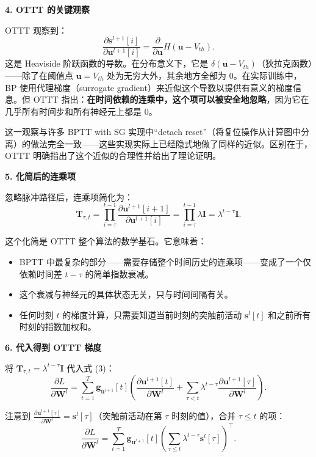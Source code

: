 \documentclass[journal,12pt,onecolumn]{IEEEtran}
\begin{document}
\medskip\noindent\textbf{4. OTTT 的关键观察}

OTTT 观察到：
\[
\frac{\partial \mathbf{s}^{l+1}[i]}{\partial \mathbf{u}^{l+1}[i]} = \frac{\partial}{\partial \mathbf{u}} H(\mathbf{u} - V_{th}).
\]
这是 Heaviside 阶跃函数的导数。在分布意义下，它是 $\delta(\mathbf{u} - V_{th})$（狄拉克函数）——除了在阈值点 $\mathbf{u} = V_{th}$ 处为无穷大外，其余地方全部为 0。在实际训练中，BP 使用代理梯度（surrogate gradient）来近似这个导数以提供有意义的梯度信息。但 OTTT 指出：\textbf{在时间依赖的连乘中，这个项可以被安全地忽略}，因为它在几乎所有时间步和所有神经元上都是 0。

这一观察与许多 BPTT with SG 实现中“detach reset”（将复位操作从计算图中分离）的做法完全一致——这些实现实际上已经隐式地做了同样的近似。区别在于，OTTT 明确指出了这个近似的合理性并给出了理论证明。

\medskip\noindent\textbf{5. 化简后的连乘项}

忽略脉冲路径后，连乘项简化为：
\begin{equation}
    \mathbf{T}_{\tau,t} = \prod_{i=\tau}^{t-1} \frac{\partial \mathbf{u}^{l+1}[i+1]}{\partial \mathbf{u}^{l+1}[i]} = \prod_{i=\tau}^{t-1} \lambda \mathbf{I} = \lambda^{t-\tau} \mathbf{I}. \tag{5}
\end{equation}

这个化简是 OTTT 整个算法的数学基石。它意味着：
\begin{itemize}
    \item BPTT 中最复杂的部分——需要存储整个时间历史的连乘项——变成了一个仅依赖时间差 $t-\tau$ 的简单指数衰减。
    \item 这个衰减与神经元的具体状态无关，只与时间间隔有关。
    \item 任何时刻 $t$ 的梯度计算，只需要知道当前时刻的突触前活动 $\mathbf{s}^l[t]$ 和之前所有时刻的指数加权和。
\end{itemize}

\medskip\noindent\textbf{6. 代入得到 OTTT 梯度}

将 $\mathbf{T}_{\tau,t} = \lambda^{t-\tau} \mathbf{I}$ 代入式 (3)：
\begin{equation}
    \frac{\partial L}{\partial \mathbf{W}^l} = \sum_{t=1}^T \mathbf{g}_{\mathbf{u}^{l+1}}[t] \left( \frac{\partial \mathbf{u}^{l+1}[t]}{\partial \mathbf{W}^l} + \sum_{\tau < t} \lambda^{t-\tau} \frac{\partial \mathbf{u}^{l+1}[\tau]}{\partial \mathbf{W}^l} \right). \tag{6}
\end{equation}

注意到 $\frac{\partial \mathbf{u}^{l+1}[\tau]}{\partial \mathbf{W}^l} = \mathbf{s}^l[\tau]$（突触前活动在第 $\tau$ 时刻的值），合并 $\tau \le t$ 的项：
\begin{equation}
    \frac{\partial L}{\partial \mathbf{W}^l} = \sum_{t=1}^T \mathbf{g}_{\mathbf{u}^{l+1}}[t] \left( \sum_{\tau \le t} \lambda^{t-\tau} \mathbf{s}^l[\tau] \right)^\top. \tag{7}
\end{equation}
\end{document}

